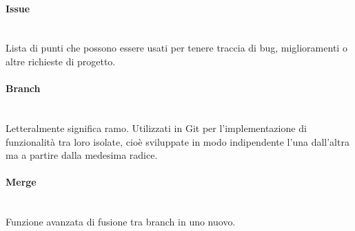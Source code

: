 \paragraph{Issue}~\smallskip \\
Lista di punti che possono essere usati per tenere traccia di bug, miglioramenti o altre richieste di progetto.

\paragraph{Branch}~\smallskip \\
Letteralmente significa ramo. Utilizzati in Git per l'implementazione di funzionalità tra loro isolate, cioè sviluppate in modo indipendente l'una dall'altra ma a partire dalla medesima radice.

\paragraph{Merge}~\smallskip \\
Funzione avanzata di fusione tra branch in uno nuovo.
